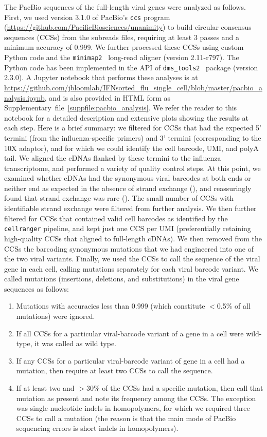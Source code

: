 \documentclass[9pt,lineno]{elife}
\begin{document}
The PacBio sequences of the full-length viral genes were analyzed as follows.
First, we used version 3.1.0 of PacBio's \texttt{ccs} program (\url{https://github.com/PacificBiosciences/unanimity}) to build circular consensus sequences (CCSs) from the subreads files, requiring at least 3 passes and a minimum accuracy of 0.999.
We further processed these CCSs using custom Python code and the \texttt{minimap2}~\citep{li2018minimap2} long-read aligner (version 2.11-r797).
The Python code has been implemented in the API of \texttt{dms\_tools2}~\citep[][\url{https://jbloomlab.github.io/dms_tools2/}]{bloom2015software} package (version 2.3.0).
A Jupyter notebook that performs these analyses is at \url{https://github.com/jbloomlab/IFNsorted_flu_single_cell/blob/master/pacbio_analysis.ipynb}, and is also provided in HTML form as Supplementary~file~\ref{suppfile:pacbio_analysis}.
We refer the reader to this notebook for a detailed description and extensive plots showing the results at each step.
Here is a brief summary: we filtered for CCSs that had the expected 5' termini (from the influenza-specific primers) and 3' termini (corresponding to the 10X adaptor), and for which we could identify the cell barcode, UMI, and polyA tail.
We aligned the cDNAs flanked by these termini to the influenza transcriptome, and performed a variety of quality control steps.
At this point, we examined whether cDNAs had the synonymous viral barcodes at both ends or neither end as expected in the absence of strand exchange (), and reassuringly found that strand exchange was rare ().
The small number of CCSs with identifiable strand exchange were filtered from further analysis.
We then further filtered for CCSs that contained valid cell barcodes as identified by the \texttt{cellranger} pipeline, and kept just one CCS per UMI (preferentially retaining high-quality CCSs that aligned to full-length cDNAs).
We then removed from the CCSs the barcoding synonymous mutations that we had engineered into one of the two viral variants.
Finally, we used the CCSs to call the sequence of the viral gene in each cell, calling mutations separately for each viral barcode variant.
We called mutations (insertions, deletions, and substitutions) in the viral gene sequences as follows:
\begin{enumerate}
\item Mutations with accuracies less than 0.999 (which constitute $<$0.5\% of all mutations) were ignored.
\item If all CCSs for a particular viral-barcode variant of a gene in a cell were wild-type, it was called as wild type.
\item If any CCSs for a particular viral-barcode variant of gene in a cell had a mutation, then require at least two CCSs to call the sequence.
\item If at least two and $>$30\% of the CCSs had a specific mutation, then call that mutation as present and note its frequency among the CCSs. The exception was single-nucleotide indels in homopolymers, for which we required three CCSs to call a mutation (the reason is that the main mode of PacBio sequencing errors is short indels in homopolymers).
\end{enumerate}
\end{document}
